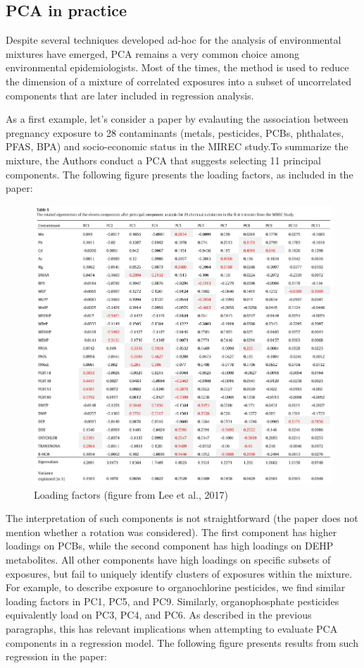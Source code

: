 \documentclass[
]{book}
\begin{document}
\hypertarget{pca-in-practice}{%
\subsection{PCA in practice}\label{pca-in-practice}}

Despite several techniques developed ad-hoc for the analysis of environmental mixtures have emerged, PCA remains a very common choice among environmental epidemiologists. Most of the times, the method is used to reduce the dimension of a mixture of correlated exposures into a subset of uncorrelated components that are later included in regression analysis.

As a first example, let's consider a paper by \citet{lee2017identification} evalauting the association between pregnancy exposure to 28 contaminants (metals, pesticides, PCBs, phthalates, PFAS, BPA) and socio-economic status in the MIREC study.To summarize the mixture, the Authors conduct a PCA that suggests selecting 11 principal components. The following figure presents the loading factors, as included in the paper:

\begin{figure}
\centering
\includegraphics{images/table5.png}
\caption{Loading factors (figure from Lee et al., 2017)}
\end{figure}

The interpretation of such components is not straightforward (the paper does not mention whether a rotation was considered). The first component has higher loadings on PCBs, while the second component has high loadings on DEHP metabolites. All other components have high loadings on specific subsets of exposures, but fail to uniquely identify clusters of exposures within the mixture. For example, to describe exposure to organochlorine pesticides, we find similar loading factors in PC1, PC5, and PC9. Similarly, organophosphate pesticides equivalently load on PC3, PC4, and PC6. As described in the previous paragraphs, this has relevant implications when attempting to evaluate PCA components in a regression model. The following figure presents results from such regression in the paper:
\end{document}

